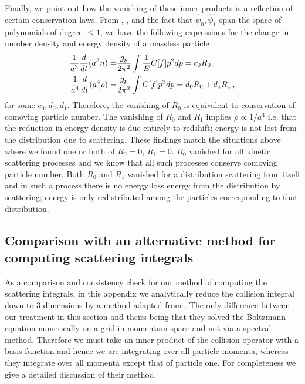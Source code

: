 Finally, we point out how the vanishing of these inner products is a reflection of certain conservation laws. From , , and the fact that $\hat\psi_0,\hat\psi_1$ span the space of polynomials of degree $\leq 1$, we have the following expressions for the change in number density and energy density of a massless particle
\begin{align}
\frac{1}{a^3} \frac{d}{dt}(a^3n)=&\frac{g_p}{2\pi^2}\int \frac{1}{E}C[f]p^2dp=c_0 R_0\,,\\
\frac{1}{a^4}\frac{d}{dt}(a^4\rho)=&\frac{g_p}{2\pi^2}\int C[f] p^2dp=d_0R_0+d_1R_1\,,\notag
\end{align}
for some $c_0,d_0,d_1$. Therefore, the vanishing of $R_0$ is equivalent to conservation of comoving particle number.  The vanishing of $R_0$ and $R_1$ implies $\rho\propto 1/a^4$ i.e. that the reduction in energy density is due entirely to redshift; energy is not lost from the distribution due to scattering.  These findings match the situations above where we found one or both of $R_0=0$, $R_1=0$.  $R_0$ vanished for all kinetic scattering processes and we know that all such processes conserve comoving particle number.  Both $R_0$ and $R_1$ vanished for a distribution scattering from itself and in such a process  there is no energy loss energy  from the distribution by scattering; energy is only redistributed among the particles corresponding to that distribution.



\subsection{Comparison with an alternative method for computing scattering integrals}\label{app:dogovMethod}
As a comparison and consistency check for our method of computing the scattering integrals, in this appendix we analytically reduce the collision integral down to $3$ dimensions by a method adapted from \cite{Dolgov:1997mb,Dolgov:1998sf}.  The only difference between our treatment in this section and theirs being that they solved the Boltzmann equation numerically on a grid in momentum space and not via a spectral method.  Therefore we must take an inner product of the collision operator with a basis function and hence we are integrating over all particle momenta, whereas they integrate over all momenta except that of particle one.  For completeness we give a detailed discussion of their method.

